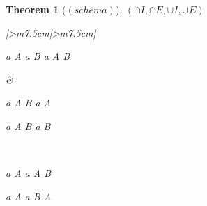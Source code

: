 \documentclass[10pt,a4paper]{book}
\newtheorem{theorem}{Theorem}[section]
\begin{document}
\begin{theorem}
    [$(schema)$] $(\cap I , \cap E , \cup I , \cup E)$

    \begin{tabular}{|>{\centering\arraybackslash}m{7.5cm}|>{\centering\arraybackslash}m{7.5cm}|}
        \hline
        \begin{fitchproof}[arrayenv=tabular]
             {a \in A}
             {a \in B  }
             {\therefore  a \in  A \cap B } 
        \end{fitchproof}
        \rule[0pt]{0pt}{0pt} &

        \begin{minipage}[t]{\linewidth}
            \centering
            \begin{minipage}[t]{0.48\linewidth}
                \begin{fitchproof}[arrayenv=tabular]
                     {a \in  A \cap B }
                     {\therefore a \in  A } 
                \end{fitchproof}
            \end{minipage}
            \begin{minipage}[t]{0.48\linewidth}
                \begin{fitchproof}[arrayenv=tabular]
                     {a \in  A \cap B }
                     {\therefore  a \in  B } 
                \end{fitchproof}
            \end{minipage}
        \end{minipage}
        \\
        \hline

        \begin{fitchproof}[arrayenv=tabular]
             {a \in A   }
             {\therefore   a \in  A \cup B  } 
        \end{fitchproof}

        \begin{fitchproof}[arrayenv=tabular]
             {a \in A   }
             { \therefore  a \in  B \cup A } 
        \end{fitchproof}


\end{tabular}
\end{theorem}
\end{document}
